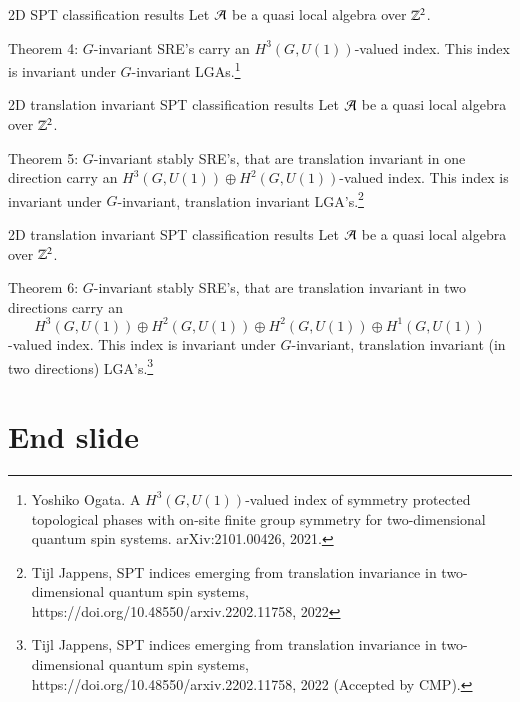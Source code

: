 \documentclass{beamer}
\begin{document}
\begin{frame}{2D SPT classification results}
	Let $\AA$ be a quasi local algebra over $\ZZ^2$.
	\begin{block}{Theorem 4:}
		$G$-invariant SRE's carry an $H^3(G,U(1))$-valued index. This index is invariant under $G$-invariant LGAs.\footnote{Yoshiko Ogata. A $H^3(G,U(1))$-valued index of symmetry protected topological phases with on-site finite group symmetry for two-dimensional quantum spin systems. arXiv:2101.00426, 2021.}
	\end{block}
\end{frame}

\begin{frame}{2D translation invariant SPT classification results}
	Let $\AA$ be a quasi local algebra over $\ZZ^2$.
	\begin{block}{Theorem 5:}
		$G$-invariant stably SRE's, that are translation invariant in one direction carry an $H^3(G,U(1))\oplus H^2(G,U(1))$-valued index. This index is invariant under $G$-invariant, translation invariant LGA's.\footnote{Tijl Jappens, SPT indices emerging from translation invariance in two-dimensional quantum spin systems, https://doi.org/10.48550/arxiv.2202.11758, 2022}
	\end{block}
\end{frame}

\begin{frame}{2D translation invariant SPT classification results}
	Let $\AA$ be a quasi local algebra over $\ZZ^2$.
	\begin{block}{Theorem 6:}
		$G$-invariant stably SRE's, that are translation invariant in two directions carry an
		\[H^3(G,U(1))\oplus H^2(G,U(1))\oplus H^2(G,U(1))\oplus H^1(G,U(1))\]
		-valued index. This index is invariant under $G$-invariant, translation invariant (in two directions) LGA's.\footnote{Tijl Jappens, SPT indices emerging from translation invariance in two-dimensional quantum spin systems, https://doi.org/10.48550/arxiv.2202.11758, 2022 (Accepted by CMP).}
	\end{block}
\end{frame}

\section{End slide}
\end{document}
